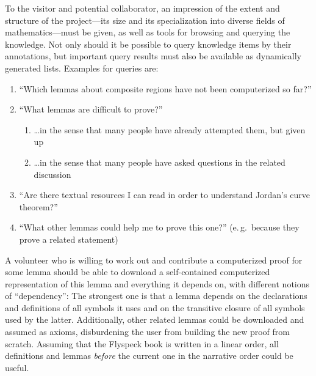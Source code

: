 To the visitor and potential collaborator, an impression of the extent and
structure of the project---its size and its specialization into diverse fields
of mathematics---must be given, as well as tools for browsing and querying the
knowledge.  Not only should it be possible to query knowledge items by their
annotations, but important query results must also be available as dynamically
generated lists.  Examples for queries are:

\begin{enumerate}
\item\label{item:proven-lemma} ``Which lemmas about composite regions have not
  been computerized so far?''
\item ``What lemmas are difficult to prove?''
  \begin{enumerate}
  \item \ldots in the sense that many people have already attempted them, but given up
  \item\label{item:question-count} \ldots in the sense that many people have asked
    questions in the related discussion
  \end{enumerate}
\item ``Are there textual resources I can read in order to understand Jordan's
  curve theorem?''
\item ``What other lemmas could help me to prove this one?'' (e.\,g.\ because
  they prove a related statement)
\end{enumerate}

A volunteer who is willing to work out and contribute a computerized proof for
some lemma should be able to download a self-contained computerized
representation of this lemma and everything it depends on, with different
notions of ``dependency'': The strongest one is that a lemma depends on the
declarations and definitions of all symbols it uses and on the transitive
closure of all symbols used by the latter.  Additionally, other related lemmas
could be downloaded and assumed as axioms, disburdening the user from building
the new proof from scratch.  Assuming that the Flyspeck book is written in a
linear order, all definitions and lemmas \emph{before} the current one in the
narrative order could be useful.

